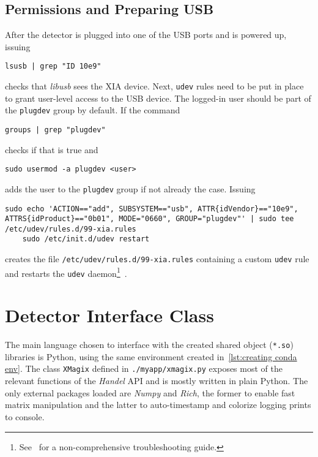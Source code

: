         \subsection{Permissions and Preparing USB}\label{sec:permissions and preparing usb}
            After the detector is plugged into one of the USB ports and is powered up, issuing
            \begin{lstlisting}[style=mybash, numbers=none, label={lst:lsusb}]
    lsusb | grep "ID 10e9"
            \end{lstlisting}
            checks that \textit{libusb} sees the XIA device.
            Next, \texttt{udev} rules need to be put in place to grant user-level access to the USB device.
            The logged-in user should be part of the \texttt{plugdev} group by default.
            If the command
            \begin{lstlisting}[style=mybash, numbers=none, label={lst:get plugdev group}]
    groups | grep "plugdev"
            \end{lstlisting}
            checks if that is true and
            \begin{lstlisting}[style=mybash, numbers=none, label={lst:get plugdev group}]
    sudo usermod -a plugdev <user>
            \end{lstlisting}
            adds the user to the \texttt{plugdev} group if not already the case.
            Issuing
            \begin{lstlisting}[style=mybash, numbers=none, label={lst:udev}]
    sudo echo 'ACTION=="add", SUBSYSTEM=="usb", ATTR{idVendor}=="10e9", ATTRS{idProduct}=="0b01", MODE="0660", GROUP="plugdev"' | sudo tee /etc/udev/rules.d/99-xia.rules
    sudo /etc/init.d/udev restart
            \end{lstlisting}
            creates the file \texttt{/etc/udev/rules.d/99-xia.rules} containing a custom \texttt{udev} rule and restarts the \texttt{udev} daemon\footnote{See~\cite{Software.XraythesisHandel.2023} for a non-comprehensive troubleshooting guide.}~\cite{Software.HandelRelease.2023,Software.XraythesisHandel.2023}.

    \clearpage
    \section{Detector Interface Class}\label{sec:detector interface}
        The main language chosen to interface with the created shared object (\texttt{*.so}) libraries is Python, using the same environment created in~\cref{lst:creating conda env}.
        The class \texttt{XMagix} defined in \texttt{./myapp/xmagix.py} exposes most of the relevant functions of the \textit{Handel} API and is mostly written in plain Python.
        The only external packages loaded are \textit{Numpy} and \textit{Rich}, the former to enable fast matrix manipulation and the latter to auto-timestamp and colorize logging prints to console.\par\medskip

